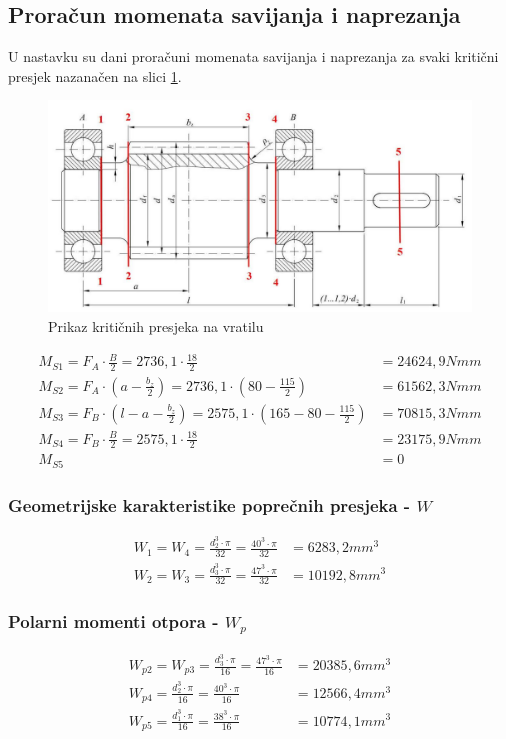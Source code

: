 \documentclass[12pt,a4paper]{article}
\begin{document}
\subsection{Proračun momenata savijanja i naprezanja}
U nastavku su dani proračuni momenata savijanja i naprezanja za svaki kritični presjek nazanačen na slici \ref{KriticniPresjeci}.
\begin{figure}[H]
\centering
\includegraphics[width=1\textwidth]{KriticniPresjeci}
\caption{Prikaz kritičnih presjeka na vratilu}\label{KriticniPresjeci}
\end{figure}
\begin{align*}
M_{S1}=F_A \cdot \frac{B}{2}=2736,1 \cdot \frac{18}{2}&=24624,9Nmm\\
M_{S2}=F_A \cdot \left(a- \frac{b_z}{2}\right)=2736,1 \cdot \left(80- \frac{115}{2}\right)&=61562,3Nmm\\
M_{S3}=F_B \cdot \left(l-a- \frac{b_z}{2}\right)=2575,1 \cdot \left(165-80- \frac{115}{2}\right)&=70815,3Nmm\\
M_{S4}=F_B \cdot \frac{B}{2}=2575,1 \cdot \frac{18}{2}&=23175,9Nmm\\
M_{S5}&=0
\end{align*}

\subsubsection*{Geometrijske karakteristike poprečnih presjeka - $W$}
\begin{align*}
W_1=W_4=\frac{d_2^3 \cdot \pi}{32}=\frac{40^3 \cdot \pi}{32}&=6283,2mm^3\\
W_2=W_3=\frac{d_3^3 \cdot \pi}{32}=\frac{47^3 \cdot \pi}{32}&=10192,8mm^3
\end{align*}
\subsubsection*{Polarni momenti otpora - $W_p$}
\begin{align*}
W_{p2}=W_{p3}=\frac{d_3^3 \cdot \pi}{16}=\frac{47^3 \cdot \pi}{16}&=20385,6mm^3\\
W_{p4}=\frac{d_2^3 \cdot \pi}{16}=\frac{40^3 \cdot \pi}{16}&=12566,4mm^3\\
W_{p5}=\frac{d_1^3 \cdot \pi}{16}=\frac{38^3 \cdot \pi}{16}&=10774,1mm^3
\end{align*}
\end{document}
